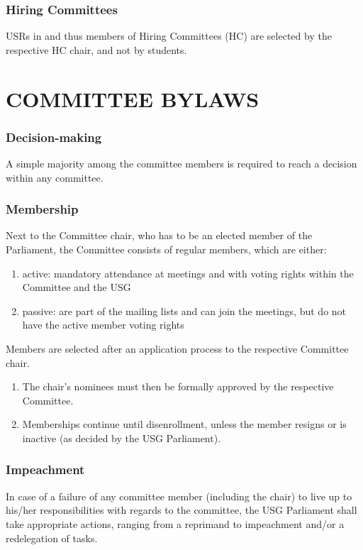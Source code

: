 \documentclass[12pt]{LaTeX_Misc/constitution}
\begin{document}
\section{Hiring Committees}
USRs in and thus members of Hiring Committees (HC) are selected by the respective HC chair, and not by students.



\part{COMMITTEE BYLAWS}
\label{PartB}


\section{Decision-making} 
A simple majority among the committee members is required to reach a decision within any committee. 

\section{Membership}
Next to the Committee chair, who has to be an elected member of the Parliament, the Committee consists of regular members, which are either:
\begin{enumerate}
    \item active: mandatory attendance at meetings and with voting rights within the Committee and the USG
    \item passive: are part of the mailing lists and can join the meetings, but do not have the active member voting rights
\end{enumerate}
Members are selected after an application process to the respective Committee chair.
\begin{enumerate}[label={\textbf{\S\arabic*}}]
\item The chair's  nominees must then be formally approved by the respective Committee. 
\item Memberships continue until disenrollment, unless the member resigns or is inactive (as decided by the USG Parliament).
\end{enumerate}


\section{Impeachment}
In case of a failure of any committee member (including the chair) to live up to his/her responsibilities with regards to the committee, the USG Parliament shall take appropriate actions, ranging from a reprimand to impeachment and/or a redelegation of tasks.
\end{document}
